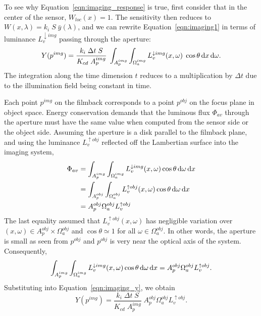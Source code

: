 To see why Equation~\eqref{eqn:imaging_response} is true, first consider that in the center of the sensor,
$W_{loc}(x) = 1$. The sensitivity then reduces to $W(x,\lambda) = k_i\;S\;\bar y(\lambda)$,
and we can rewrite Equation~\eqref{eqn:imaging1} in terms of luminance
$L_v^{\downarrow img}$ passing through the aperture:
\begin{equation}\label{eqn:imaging_y}
Y(p^{img}) 
           = \frac{k_i\; \Delta t \; S}{K_{cd}\;A^{img}_p} \;
             \int_{A_p^{img}} 
             \int_{\Omega_a^{img}} 
                L^{\downarrow img}_{v}(x, \omega) \;
                \cos\theta \mathop{}\!\mathrm{d} x \mathop{}\!\mathrm{d}\omega.
\end{equation}
The integration along the time dimension $t$ reduces to a multiplication
by $\Delta t$ due to the illumination field being constant in time. 

%

Each point $p^{img}$ on the filmback corresponds to a point $p^{obj}$ on the
focus plane in object space. Energy conservation demands that the luminous flux
$\Phi_{av}$ through the aperture must have the same value when computed from the
sensor side or the object side. Assuming the aperture is a disk parallel to 
the filmback plane, and using the luminance $L_v^{\uparrow obj}$ reflected off
the Lambertian surface into the imaging system,
\begin{equation}\label{eqn:imaging_energyconservation}
    \begin{split}
    \Phi_{av} &= \int_{A_p^{img}} \int_{\Omega_a^{img}} L_v^{\downarrow img}(x,\omega) \cos\theta \mathop{}\!\mathrm{d}\omega \mathop{}\!\mathrm{d} x \\
              &= \int_{A_p^{obj}} \int_{\Omega_a^{obj}} L_v^{\uparrow obj}(x,\omega) \cos\theta \mathop{}\!\mathrm{d}\omega \mathop{}\!\mathrm{d} x  \\
              &= A_p^{obj} \Omega_a^{obj} L_v^{\uparrow obj} 
    \end{split}
\end{equation}
The last equality assumed that $L_v^{\uparrow obj}(x,\omega)$ has
negligible variation over $(x,\omega)\in A_p^{obj}\times\Omega^{obj}_a$
and $\cos\theta \simeq 1$ for all $\omega\in\Omega^{obj}_a$. 
In other words, the aperture is small as seen from $p^{obj}$
and $p^{obj}$ is very near the optical axis of the system. 
Consequently,
\begin{equation}
    \int_{A_p^{img}} \int_{\Omega_a^{img}} L_v^{\downarrow img}(x,\omega) \cos\theta \mathop{}\!\mathrm{d}\omega \mathop{}\!\mathrm{d} x 
     = A_p^{obj} \Omega_a^{obj}L_v^{\uparrow obj}.
\end{equation}
Substituting into Equation~\eqref{eqn:imaging_y}, we obtain
\begin{equation}\label{eqn:pixel_value_area_solidangle}
  Y(p^{img}) = \frac{k_i\; \Delta t \; S}{K_{cd}\;A^{img}_p} \; A_p^{obj} \Omega_a^{obj}L_v^{\uparrow obj}.
\end{equation}

